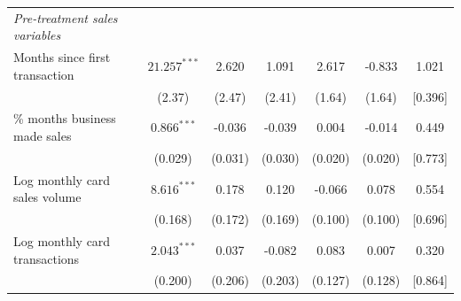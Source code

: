 \begin{table}[H]
{\begin{tabular}{lcccccc}
\emph{Pre-treatment sales variables} \\
\quad Months since first transaction & $21.257^{***}$ & 2.620 & 1.091 & 2.617 & -0.833 & 1.021\\
 & (2.37) & (2.47) & (2.41) & (1.64) & (1.64) & {}[0.396]\\
\quad \% months business made sales & $0.866^{***}$ & -0.036 & -0.039 & 0.004 & -0.014 & 0.449\\
 & (0.029) & (0.031) & (0.030) & (0.020) & (0.020) & {}[0.773]\\
\quad Log monthly card sales volume & $8.616^{***}$ & 0.178 & 0.120 & -0.066 & 0.078 & 0.554\\
 & (0.168) & (0.172) & (0.169) & (0.100) & (0.100) & {}[0.696]\\
\quad Log monthly card transactions & $2.043^{***}$ & 0.037 & -0.082 & 0.083 & 0.007 & 0.320\\
 & (0.200) & (0.206) & (0.203) & (0.127) & (0.128) & {}[0.864]\\
\bottomrule
\end{tabular}} 
\end{table} 
